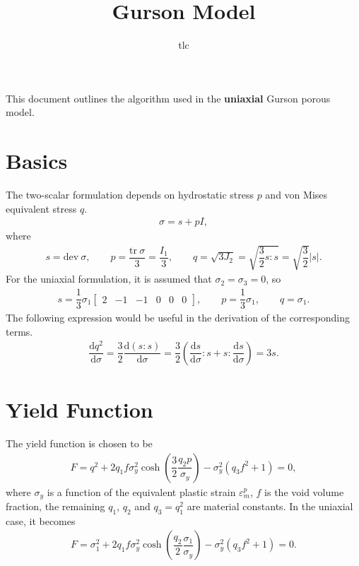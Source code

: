 \documentclass[10pt,fleqn,3p]{elsarticle}
\title{Gurson Model}\date{}\author{tlc}
\newcommand*{\md}[1]{\mathrm{d}#1}
\newcommand*{\tr}[1]{\mathrm{tr}~#1}
\newcommand*{\dev}[1]{\mathrm{dev}~#1}
\newcommand*{\ddfrac}[2]{\dfrac{\md#1}{\md#2}}
\begin{document}
\pagestyle{empty}
This document outlines the algorithm used in the \textbf{uniaxial} Gurson porous model.
\section{Basics}
The two-scalar formulation depends on hydrostatic stress $p$ and von Mises equivalent stress $q$.
\begin{gather*}
\sigma=s+pI,
\end{gather*}
where
\begin{gather*}
s=\dev{\sigma},\qquad{}p=\dfrac{\tr{\sigma}}{3}=\dfrac{I_1}{3},\qquad{}q=\sqrt{3J_2}=\sqrt{\dfrac{3}{2}s:s}=\sqrt{\dfrac{3}{2}}|s|.
\end{gather*}
For the uniaxial formulation, it is assumed that $\sigma_2=\sigma_3=0$, so
\begin{gather}
s=\dfrac{1}{3}\sigma_1\begin{bmatrix}2&-1&-1&0&0&0
\end{bmatrix},\qquad{}p=\dfrac{1}{3}\sigma_1,\qquad
q=\sigma_1.
\end{gather}
The following expression would be useful in the derivation of the corresponding terms.
\begin{gather*}
\ddfrac{q^2}{\sigma}=\dfrac{3}{2}\ddfrac{\left(s:s\right)}{\sigma}=\dfrac{3}{2}\left(\ddfrac{s}{\sigma}:s+s:\ddfrac{s}{\sigma}\right)=3s.
\end{gather*}
\section{Yield Function}
The yield function is chosen to be
\begin{gather*}
F=q^2+2q_1f\sigma_y^2\cosh\left(\dfrac{3}{2}\dfrac{q_2p}{\sigma_y}\right)-\sigma_y^2\left(q_3f^2+1\right)=0,
\end{gather*}
where $\sigma_y$ is a function of the equivalent plastic strain $\varepsilon^p_m$, $f$ is the void volume fraction, the remaining $q_1$, $q_2$ and $q_3=q_1^2$ are material constants. In the uniaxial case, it becomes
\begin{gather}
F=\sigma_1^2+2q_1f\sigma_y^2\cosh\left(\dfrac{q_2}{2}\dfrac{\sigma_1}{\sigma_y}\right)-\sigma_y^2\left(q_3f^2+1\right)=0.
\end{gather}
\end{document}
